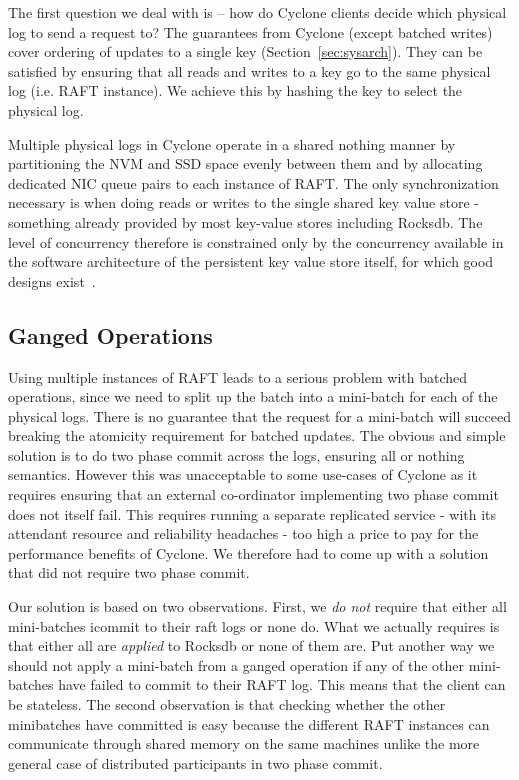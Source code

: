 \documentclass[letterpaper,twocolumn,10pt]{article}
\begin{document}
The first question we deal with is -- how do Cyclone clients decide
which physical log to send a request to? The guarantees from Cyclone
(except batched writes) cover ordering of updates to a single key
(Section~\ref{sec:sysarch}). They can be satisfied by ensuring that
all reads and writes to a key go to the same physical log (i.e. RAFT
instance). We achieve this by hashing the key to select the physical
log.

Multiple physical logs in Cyclone operate in a shared nothing manner
by partitioning the NVM and SSD space evenly between them and by
allocating dedicated NIC queue pairs to each instance of RAFT.  The
only synchronization necessary is when doing reads or writes to the
single shared key value store - something already provided by most
key-value stores including Rocksdb.  The level of concurrency
therefore is constrained only by the concurrency available in the
software architecture of the persistent key value store itself, for
which good designs exist~\cite{flodb}.

\subsection{Ganged Operations}
Using multiple instances of RAFT leads to a serious problem with
batched operations, since we need to split up the batch into a
mini-batch for each of the physical logs. There is no guarantee that
the request for a mini-batch will succeed breaking the atomicity
requirement for batched updates. The obvious and simple solution is to
do two phase commit across the logs, ensuring all or nothing
semantics. However this was unacceptable to some use-cases of Cyclone
as it requires ensuring that an external co-ordinator implementing two
phase commit does not itself fail. This requires running a separate
replicated service - with its attendant resource and reliability
headaches - too high a price to pay for the performance benefits of
Cyclone.  We therefore had to come up with a solution that did not
require two phase commit.

Our solution is based on two observations. First, we \emph {do not}
require that either all mini-batches icommit to their raft logs or
none do. What we actually requires is that either all are
\emph{applied} to Rocksdb or none of them are. Put another way we
should not apply a mini-batch from a ganged operation if any of the
other mini-batches have failed to commit to their RAFT log. This means
that the client can be stateless. The second observation is that
checking whether the other minibatches have committed is easy because
the different RAFT instances can communicate through shared memory on
the same machines unlike the more general case of distributed
participants in two phase commit.
\end{document}
